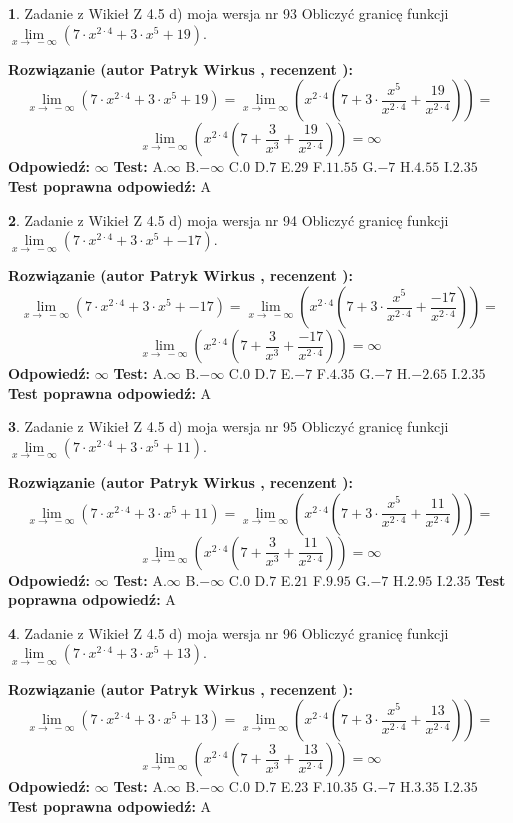 \documentclass[12pt, a4paper]{article}
\theoremstyle{definition} %
\newtheorem{zad}{}
\newcommand{\zadStart}[1]{\begin{zad}#1\newline}
\newcommand{\zadStop}{\end{zad}}
\newcommand{\rozwStart}[2]{\noindent \textbf{Rozwiązanie (autor #1 , recenzent #2): }\newline}
\newcommand{\rozwStop}{\newline}
\newcommand{\odpStart}{\noindent \textbf{Odpowiedź:}\newline}
\newcommand{\odpStop}{\newline}
\newcommand{\testStart}{\noindent \textbf{Test:}\newline}
\newcommand{\testStop}{\newline}
\newcommand{\kluczStart}{\noindent \textbf{Test poprawna odpowiedź:}\newline}
\newcommand{\kluczStop}{\newline}
\begin{document}
\zadStart{Zadanie z Wikieł Z 4.5 d) moja wersja nr 93}
Obliczyć granicę funkcji  $\lim\limits_{x\to\ -\infty}(7 \cdot x^{2\cdot4}+3 \cdot x^{5}+19)$.
\zadStop
\rozwStart{Patryk Wirkus}{}
$$\lim\limits_{x\to\ -\infty}(7 \cdot x^{2\cdot4}+3 \cdot x^{5}+19) = \lim\limits_{x\to\ -\infty}(x^{2\cdot4}(7 +3 \cdot \frac{x^{5}}{x^{2\cdot4}}+\frac{19}{x^{2\cdot4}})) =$$ $$\lim\limits_{x\to\ -\infty}(x^{2\cdot4}(7 +\frac{3}{x^{3}}+\frac{19}{x^{2\cdot4}})) =\infty$$
\rozwStop
\odpStart
$\infty$
\odpStop
\testStart
A.$\infty$ B.$-\infty$ C.$0$ D.$7$ E.$29$
F.$11.55$ G.$-7$
H.$4.55$
I.$2.35$
\testStop
\kluczStart
A
\kluczStop



\zadStart{Zadanie z Wikieł Z 4.5 d) moja wersja nr 94}
Obliczyć granicę funkcji  $\lim\limits_{x\to\ -\infty}(7 \cdot x^{2\cdot4}+3 \cdot x^{5}+-17)$.
\zadStop
\rozwStart{Patryk Wirkus}{}
$$\lim\limits_{x\to\ -\infty}(7 \cdot x^{2\cdot4}+3 \cdot x^{5}+-17) = \lim\limits_{x\to\ -\infty}(x^{2\cdot4}(7 +3 \cdot \frac{x^{5}}{x^{2\cdot4}}+\frac{-17}{x^{2\cdot4}})) =$$ $$\lim\limits_{x\to\ -\infty}(x^{2\cdot4}(7 +\frac{3}{x^{3}}+\frac{-17}{x^{2\cdot4}})) =\infty$$
\rozwStop
\odpStart
$\infty$
\odpStop
\testStart
A.$\infty$ B.$-\infty$ C.$0$ D.$7$ E.$-7$
F.$4.35$ G.$-7$
H.$-2.65$
I.$2.35$
\testStop
\kluczStart
A
\kluczStop



\zadStart{Zadanie z Wikieł Z 4.5 d) moja wersja nr 95}
Obliczyć granicę funkcji  $\lim\limits_{x\to\ -\infty}(7 \cdot x^{2\cdot4}+3 \cdot x^{5}+11)$.
\zadStop
\rozwStart{Patryk Wirkus}{}
$$\lim\limits_{x\to\ -\infty}(7 \cdot x^{2\cdot4}+3 \cdot x^{5}+11) = \lim\limits_{x\to\ -\infty}(x^{2\cdot4}(7 +3 \cdot \frac{x^{5}}{x^{2\cdot4}}+\frac{11}{x^{2\cdot4}})) =$$ $$\lim\limits_{x\to\ -\infty}(x^{2\cdot4}(7 +\frac{3}{x^{3}}+\frac{11}{x^{2\cdot4}})) =\infty$$
\rozwStop
\odpStart
$\infty$
\odpStop
\testStart
A.$\infty$ B.$-\infty$ C.$0$ D.$7$ E.$21$
F.$9.95$ G.$-7$
H.$2.95$
I.$2.35$
\testStop
\kluczStart
A
\kluczStop



\zadStart{Zadanie z Wikieł Z 4.5 d) moja wersja nr 96}
Obliczyć granicę funkcji  $\lim\limits_{x\to\ -\infty}(7 \cdot x^{2\cdot4}+3 \cdot x^{5}+13)$.
\zadStop
\rozwStart{Patryk Wirkus}{}
$$\lim\limits_{x\to\ -\infty}(7 \cdot x^{2\cdot4}+3 \cdot x^{5}+13) = \lim\limits_{x\to\ -\infty}(x^{2\cdot4}(7 +3 \cdot \frac{x^{5}}{x^{2\cdot4}}+\frac{13}{x^{2\cdot4}})) =$$ $$\lim\limits_{x\to\ -\infty}(x^{2\cdot4}(7 +\frac{3}{x^{3}}+\frac{13}{x^{2\cdot4}})) =\infty$$
\rozwStop
\odpStart
$\infty$
\odpStop
\testStart
A.$\infty$ B.$-\infty$ C.$0$ D.$7$ E.$23$
F.$10.35$ G.$-7$
H.$3.35$
I.$2.35$
\testStop
\kluczStart
A
\kluczStop
\end{document}
